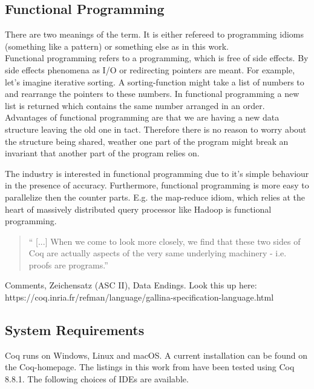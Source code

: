 \subsection{Functional Programming}
There are two meanings of the term. 
It is either refereed to programming idioms (something like a pattern) or something else as in this work.\\

Functional programming refers to a programming, which is free of side effects.
By side effects phenomena as I/O or redirecting pointers are meant. 
For example, let's imagine iterative sorting. 
A sorting-function might take a list of numbers to and rearrange the pointers to these numbers.
In functional programming a new list is returned which contains the same number arranged in an order.\\ 
Advantages of functional programming are  that we are having a new data structure leaving the old one in tact. 
Therefore there is no reason to worry about the structure being shared, weather one part of the program might break an invariant that another part of the program relies on.\par
The industry is interested in functional programming due to it's simple behaviour in the presence of accuracy.
Furthermore, functional programming is more easy to parallelize then the counter parts.
E.g. the map-reduce idiom, which relies at the heart of massively distributed query processor like \gls{Hadoop} is functional programming. 

\begin{quote}
`` [...] When we come to look more closely, we find that these two sides of Coq are actually aspects of the very same underlying machinery - i.e. proofs are programs.'' 
\end{quote}



Comments, Zeichensatz (ASC II), Data Endings.
Look this up here:\\
https://coq.inria.fr/refman/language/gallina-specification-language.html




\subsection{System Requirements}

Coq runs on Windows, Linux and macOS.
A current installation can be found on the Coq-homepage. 
The listings in this work from \cite{PACGGHSY} have been tested using Coq 8.8.1.
The following choices of IDEs are available. 

